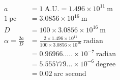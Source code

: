 \begin{align*}
  a &= 1\ \mathrm{A.U.} = 1.496 \times 10^{11}\ \mathrm{m} \\
  1\ \mathrm{pc} &= 3.0856 \times 10^{16}\ \mathrm{m} \\
  D &= 100 \times 3.0856 \times 10^{16}\ \mathrm{m} \\
  \alpha = \frac{2a}{D}
    &= \frac{2 \times 1.496 \times 10^{11}}{100 \times 3.0856 \times 10^{16}}\
      \text{radian} \\
    &= 0.96966..... \times 10^{-7}\ \text{radian} \\
    &= 5.555779... \times 10^{-6}\ \text{degree} \\
    &= 0.02\ \text{arc second}
\end{align*}
